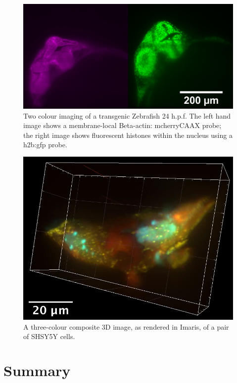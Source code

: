 \begin{figure}
    \centering
    \includegraphics[width=0.8\linewidth]{./fish_image}
    \caption{Two colour imaging of a transgenic Zebrafish 24 h.p.f.
    The left hand image shows a membrane-local  Beta-actin: mcherryCAAX probe;
    the right image shows fluorescent histones within the nucleus using a h2b:gfp probe.}
    \label{fig:fish_image}
\end{figure}

\begin{figure}
    \centering
    \includegraphics[width=0.8\linewidth]{./cell_image}
    \caption{A three-colour composite 3D image, as rendered in Imaris, of a pair of SHSY5Y cells.}
    \label{fig:cell_image}
\end{figure}

\section{Summary}

